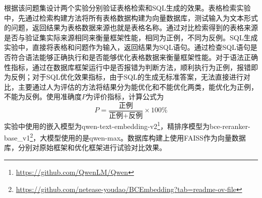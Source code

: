 根据该问题集设计两个实验分别验证表格检索和SQL生成的效果。表格检索实验中，先通过检索构建方法将所有表格数据构建为向量数据库，测试输入为文本形式的问题，返回结果为表格数据来源也就是表格名称。通过对比检索得到的表格来源是否与验证集实际来源相同来衡量框架性能，相同为正例，不同为反例。SQL生成实验中，直接将表格和问题作为输入，返回结果为SQL语句。通过检查SQL语句是否符合语法能够正确执行和是否能够优化表格数据来衡量框架性能。对于语法正确性指标，通过在数据库框架运行中是否报错为判断方法，顺利执行为正例，报错即为反例；对于SQL优化效果指标，由于SQL的生成无标准答案，无法直接进行对比，主要通过人为评估的方法将结果分为能优化和不能优化两类，能优化为正例，不能为反例。使用准确度$P$为评价指标，计算公式为
\begin{equation}
    P = \frac{\text{正例}}{\text{正例+反例}} \times 100\%
\end{equation}
实验中使用的嵌入模型为qwen-text-embedding-v2\footnote[1]{\url{https://github.com/QwenLM/Qwen}}，精排序模型为bce-reranker-base\_v1\footnote[2]{\url{https://github.com/netease-youdao/BCEmbedding?tab=readme-ov-file}}，大模型使用的是qwen-max。数据库构建上使用FAISS作为向量数据库，分别对原始框架和优化框架进行试验对比效果。
